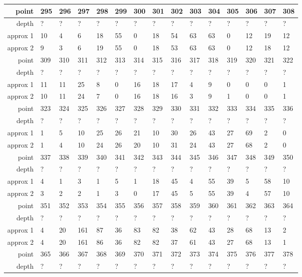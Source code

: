 \begin{center}
\begin{supertabular}{|r|l l l l l l l l l l l l l l|}
\hline
point & 295 & 296 & 297 & 298 & 299 & 300 & 301 & 302 & 303 & 304 & 305 & 306 & 307 & 308 \\
\hline
depth & ? & ? & ? & ? & ? & ? & ? & ? & ? & ? & ? & ? & ? & ? \\
approx 1 & 10 & 4 & 6 & 18 & 55 & 0 & 18 & 54 & 63 & 63 & 0 & 12 & 19 & 12 \\
approx 2 & 9 & 3 & 6 & 19 & 55 & 0 & 18 & 53 & 63 & 63 & 0 & 12 & 18 & 12 \\
\hline
point & 309 & 310 & 311 & 312 & 313 & 314 & 315 & 316 & 317 & 318 & 319 & 320 & 321 & 322 \\
\hline
depth & ? & ? & ? & ? & ? & ? & ? & ? & ? & ? & ? & ? & ? & ? \\
approx 1 & 11 & 11 & 25 & 8 & 0 & 16 & 18 & 17 & 4 & 9 & 0 & 0 & 0 & 1 \\
approx 2 & 10 & 11 & 24 & 7 & 0 & 16 & 18 & 16 & 3 & 9 & 1 & 0 & 0 & 1 \\
\hline
point & 323 & 324 & 325 & 326 & 327 & 328 & 329 & 330 & 331 & 332 & 333 & 334 & 335 & 336 \\
\hline
depth & ? & ? & ? & ? & ? & ? & ? & ? & ? & ? & ? & ? & ? & ? \\
approx 1 & 1 & 5 & 10 & 25 & 26 & 21 & 10 & 30 & 26 & 43 & 27 & 69 & 2 & 0 \\
approx 2 & 1 & 4 & 10 & 24 & 26 & 20 & 10 & 31 & 24 & 43 & 27 & 68 & 2 & 0 \\
\hline
point & 337 & 338 & 339 & 340 & 341 & 342 & 343 & 344 & 345 & 346 & 347 & 348 & 349 & 350 \\
\hline
depth & ? & ? & ? & ? & ? & ? & ? & ? & ? & ? & ? & ? & ? & ? \\
approx 1 & 4 & 1 & 3 & 1 & 5 & 1 & 18 & 45 & 4 & 55 & 39 & 5 & 58 & 10 \\
approx 2 & 3 & 2 & 2 & 1 & 3 & 0 & 17 & 45 & 5 & 55 & 39 & 4 & 57 & 10 \\
\hline
point & 351 & 352 & 353 & 354 & 355 & 356 & 357 & 358 & 359 & 360 & 361 & 362 & 363 & 364 \\
\hline
depth & ? & ? & ? & ? & ? & ? & ? & ? & ? & ? & ? & ? & ? & ? \\
approx 1 & 4 & 20 & 161 & 87 & 36 & 83 & 82 & 38 & 62 & 43 & 28 & 68 & 13 & 2 \\
approx 2 & 4 & 20 & 161 & 86 & 36 & 82 & 82 & 37 & 61 & 43 & 27 & 68 & 13 & 1 \\
\hline
point & 365 & 366 & 367 & 368 & 369 & 370 & 371 & 372 & 373 & 374 & 375 & 376 & 377 & 378 \\
\hline
depth & ? & ? & ? & ? & ? & ? & ? & ? & ? & ? & ? & ? & ? & ? \\

\end{supertabular}
\end{center}
